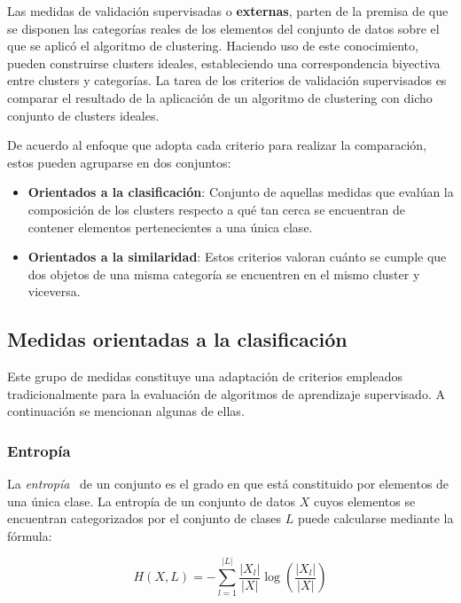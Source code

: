 Las medidas de validación supervisadas o \textbf{externas}, parten de la premisa de que se disponen las categorías reales de los elementos del conjunto de datos sobre el que se aplicó el algoritmo de clustering.
Haciendo uso de este conocimiento, pueden construirse clusters ideales, estableciendo una correspondencia biyectiva entre clusters y categorías.
La tarea de los criterios de validación supervisados es comparar el resultado de la aplicación de un algoritmo de clustering con dicho conjunto de clusters ideales.

De acuerdo al enfoque que adopta cada criterio para realizar la comparación, estos pueden agruparse en dos conjuntos:

\begin{itemize}
    \item \textbf{Orientados a la clasificación}: Conjunto de aquellas medidas que evalúan la composición de los clusters respecto a qué tan cerca se encuentran de contener elementos pertenecientes a una única clase.
    \item \textbf{Orientados a la similaridad}: Estos criterios valoran cuánto se cumple que dos objetos de una misma categoría se encuentren en el mismo cluster y viceversa.
\end{itemize}

\subsection{Medidas orientadas a la clasificación}\label{subsec:medidasOrientadasALaClasificación}

Este grupo de medidas constituye una adaptación de criterios empleados tradicionalmente para la evaluación de algoritmos de aprendizaje supervisado.
A continuación se mencionan algunas de ellas.

\subsubsection{Entropía}

La \textit{entropía}~\cite{Tan05,Wagner07} de un conjunto es el grado en que está constituido por elementos de una única clase.
La entropía de un conjunto de datos $X$ cuyos elementos se encuentran categorizados por el conjunto de clases $L$ puede calcularse mediante la fórmula:

\begin{equation}
    \label{eq:entropy}
    H(X, L) = -\sum_{l=1}^{|L|}{\frac{|X_l|}{|X|}\log{\left( \frac{|X_l|}{|X|} \right)}}
\end{equation}


